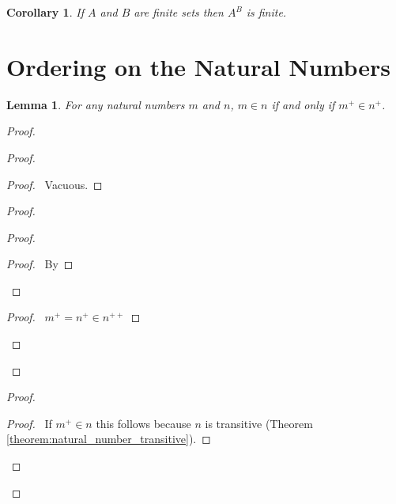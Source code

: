 \documentclass{article}
\let\qed\relax
\newtheorem{lemma}[axiom]{Lemma}
\newtheorem{corollary}{Corollary}[axiom]
\theoremstyle{definition}
\begin{document}
    \begin{corollary}
        If $A$ and $B$ are finite sets then $A^B$ is finite.
    \end{corollary}

    \section{Ordering on the Natural Numbers}

    \begin{lemma}
        \label{lemma:natural_number_order_successor}
        For any natural numbers $m$ and $n$, $m \in n$ if and only if $m^+ \in n^+$.
    \end{lemma}

    \begin{proof}
        \pf
        \begin{proof}
            \begin{proof}
                \pf\ Vacuous.
            \end{proof}
            \begin{proof}
                \begin{proof}
                    \begin{proof}
                        \pf\ By 
                    \end{proof}
                \end{proof}
                \begin{proof}
                    \pf\ $m^+ = n^+ \in n^{++}$
                \end{proof}
            \end{proof}
        \end{proof}
        \begin{proof}
            \begin{proof}
                \pf\ If $m^+ \in n$ this follows because $n$ is transitive (Theorem \ref{theorem:natural_number_transitive}).
            \end{proof}
        \end{proof}
        \qed
    \end{proof}
\end{document}
